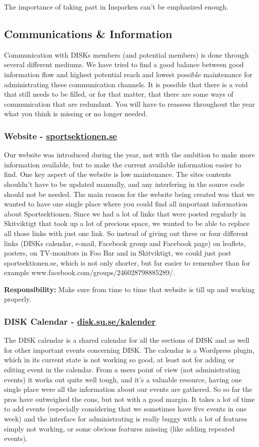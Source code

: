 \documentclass[12pt,a4paper]{article}
\begin{document}
		The importance of taking part in Insparken can't be emphasized enough.
		\subsection{Communications \& Information}
		Communication with DISKs members (and potential members) is done through several different mediums. We have tried to find a good balance between good information flow and highest potential reach and lowest possible maintenance for administrating these communication channels. It is possible that there is a void that still needs to be filled, or for that matter, that there are some ways of communication that are redundant. You will have to reassess throughout the year what you think is missing or no longer needed.
			\subsubsection{Website - \href{http://sportsektionen.se}{sportsektionen.se}}
			Our website was introduced during the year, not with the ambition to make more information available, but to make the current available information easier to find. One key aspect of the website is low maintenance. The sites contents shouldn't have to be updated manually, and any interfering in the source code should not be needed. The main reason for the website being created was that we wanted to have one single place where you could find all important information about Sportsektionen. Since we had a lot of links that were posted regularly in Skitviktigt that took up a lot of precious space, we wanted to be able to replace all those links with just one link. So instead of giving out three or four different links (DISKs calendar, e-mail, Facebook group and Facebook page) on leaflets, posters, on TV-monitors in Foo Bar and in Skitviktigt, we could just post sportsektionen.se, which is not only shorter, but far easier to remember than for example www.facebook.com/groups/246028798885289/.

			\textbf{Responsibility:} Make sure from time to time that website is till up and working properly.
			\subsubsection{DISK Calendar - \href{http://disk.su.se/kalender}{disk.su.se/kalender}}
			The DISK calendar is a shared calendar for all the sections of DISK and as well for other important events concerning DISK. The calendar is a Wordpress plugin, which in its current state is not working so good, at least not for adding or editing event in the calendar. From a users point of view (not administrating events) it works out quite well tough, and it's a valuable resource, having one single place were all the information about our events are gathered. So so far the pros have outweighed the cons, but not with a good margin. It takes a lot of time to add events (especially considering that we sometimes have five events in one week) and the interface for administrating is really buggy with a lot of features simply not working, or some obvious features missing (like adding repeated events).
\end{document}
